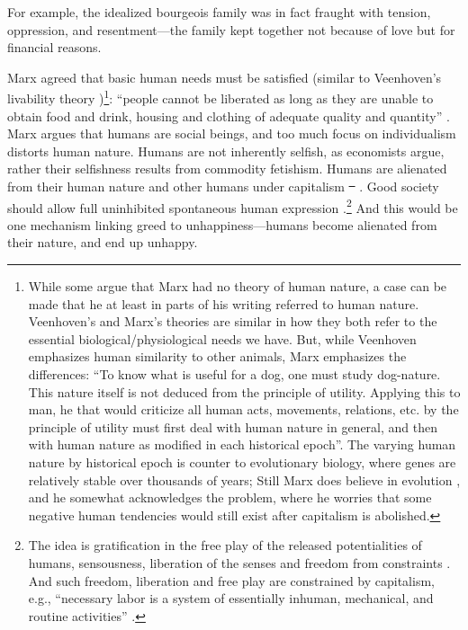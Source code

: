 \documentclass[10pt, letterpaper]{article}
\providecommand{\DIFaddtex}[1]{{\protect\color{blue}\uwave{#1}}} %
\providecommand{\DIFdeltex}[1]{{\protect\color{red}\sout{#1}}}                      %
\providecommand{\DIFaddbegin}{} %
\providecommand{\DIFaddend}{} %
\providecommand{\DIFdelbegin}{} %
\providecommand{\DIFdelend}{} %
\providecommand{\DIFadd}[1]{\texorpdfstring{\DIFaddtex{#1}}{#1}} %
\providecommand{\DIFdel}[1]{\texorpdfstring{\DIFdeltex{#1}}{}} %
\newcommand{\DIFscaledelfig}{0.5}
\newlength{\DIFdelgraphicswidth} %
\newlength{\DIFdelgraphicsheight} %
\newcommand{\DIFaddincludegraphics}[2][]{{\color{blue}\fbox{\DIFOincludegraphics[#1]{#2}}}} %
\newcommand{\DIFdelincludegraphics}[2][]{%
\sbox{\DIFdelgraphicsbox}{\DIFOincludegraphics[#1]{#2}}%
\settoboxwidth{\DIFdelgraphicswidth}{\DIFdelgraphicsbox} %
\settoboxtotalheight{\DIFdelgraphicsheight}{\DIFdelgraphicsbox} %
\scalebox{\DIFscaledelfig}{%
\parbox[b]{\DIFdelgraphicswidth}{\usebox{\DIFdelgraphicsbox}\\[-\baselineskip] \rule{\DIFdelgraphicswidth}{0em}}\llap{\resizebox{\DIFdelgraphicswidth}{\DIFdelgraphicsheight}{%
\setlength{\unitlength}{\DIFdelgraphicswidth}%
\begin{picture}(1,1)%
\thicklines\linethickness{2pt} %
{\color[rgb]{1,0,0}\put(0,0){\framebox(1,1){}}}%
{\color[rgb]{1,0,0}\put(0,0){\line( 1,1){1}}}%
{\color[rgb]{1,0,0}\put(0,1){\line(1,-1){1}}}%
\end{picture}%
}\hspace*{3pt}}} %
} %
\DeclareRobustCommand{\DIFaddbegin}{\DIFOaddbegin \let\includegraphics\DIFaddincludegraphics} %
\DeclareRobustCommand{\DIFaddend}{\DIFOaddend \let\includegraphics\DIFOincludegraphics} %
\DeclareRobustCommand{\DIFdelbegin}{\DIFOdelbegin \let\includegraphics\DIFdelincludegraphics} %
\DeclareRobustCommand{\DIFdelend}{\DIFOaddend \let\includegraphics\DIFOincludegraphics} %
\begin{document}
\begin{spacing}{1.8}
For example, the idealized bourgeois family was in fact fraught with tension,
oppression, and resentment---the family kept together not because of love but for financial reasons.

Marx agreed that basic human needs must be satisfied (similar to Veenhoven's livability theory \citep{veenhoven14b})\footnote{While some
  argue that Marx had no theory of human nature, a case can be made that he at least in parts of his writing referred to human nature. 
%
  Veenhoven's and Marx's theories are similar in how they both refer to the essential biological/physiological needs we have. But, while Veenhoven emphasizes human similarity to other animals, Marx
emphasizes the differences: ``To know what is useful for a dog, one must study dog-nature. This nature
itself is not deduced from the principle of utility. Applying this to man, he that would criticize all human acts, movements, relations, etc. by the principle
of utility must first deal with human nature in general, and then with human
nature as modified in each historical epoch''\citep[quoted in][p. 83]{struhl16}. 
The varying human nature by historical epoch is counter to evolutionary biology, where genes are relatively
stable over thousands of years; Still Marx does believe in  evolution \citep{heyer82},
and he somewhat acknowledges the problem, where he
worries that some negative human tendencies would still exist after capitalism is abolished.}: ``people cannot be
liberated as long as they are unable to obtain food and drink, housing and clothing of adequate quality and quantity'' \citep[cited in][p. 70]{geras83}.
Marx argues that humans are social beings, and too much focus on individualism
distorts human nature. %
Humans are not inherently selfish, as economists argue, rather their selfishness results from commodity fetishism. %
Humans are alienated from their human nature and other humans under capitalism \DIFdelbegin \DIFdel{\mbox{%
\citep{byron16}}\hspace{0pt}%
}\DIFdelend \DIFaddbegin \DIFadd{\mbox{%
\citep{byron16,petrovic63}}\hspace{0pt}%
}\DIFaddend . %
Good society should allow full uninhibited spontaneous human expression %
\citep{marcuse15}.\footnote{The idea is gratification in the free play of the
  released potentialities of humans, sensousness, liberation of the senses and
  freedom from constraints \citep{marcuse15}. And such freedom, liberation and
  free play are constrained by capitalism, e.g., ``necessary labor is a system of
  essentially inhuman, mechanical, and routine activities''
  \citep[][p. 195]{marcuse15}.} 
%
And this would be one mechanism linking greed  to unhappiness---humans become alienated from their nature, and end up unhappy. 


\end{spacing}
\end{document}
